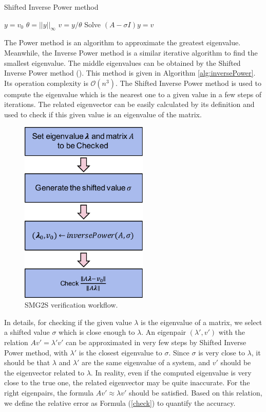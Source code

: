 \begin{algorithm}[t]{}
	\caption{ Shifted Inverse Power method}   
	\label{alg:inversePower}   
	\begin{algorithmic}[1]
		\State $y=v_0$
		\State $\theta=||y||_\infty$
		\State $v=y/\theta$
		\State Solve $(A-\sigma I)y=v$
		\EndFor 
		\EndFunction
	\end{algorithmic}  
\end{algorithm}


The Power method is an algorithm to approximate the greatest eigenvalue. Meanwhile, the Inverse Power method is a similar iterative algorithm to find the smallest eigenvalue. The middle eigenvalues can be obtained by the Shifted Inverse Power method (\cite{hernandez2005single}).  This method is given in Algorithm \ref{alg:inversePower}. Its operation complexity is $\mathcal{O}(n^3)$. The Shifted Inverse Power method is used to compute the eigenvalue which is the nearest one to a given value in a few steps of iterations. The related eigenvector can be easily calculated by its definition and used to check if this given value is an eigenvalue of the matrix.

\begin{figure}[t]
	\centering
	\includegraphics[width=2.4in]{fig/smg2s-check.pdf}
	\caption{SMG2S verification workflow.}
	\label{smg2s-check}
\end{figure}

In details, for checking if the given value $\lambda$ is the eigenvalue of a matrix, we select a shifted value $\sigma$ which is close enough to $\lambda$. An eigenpair $(\lambda', v')$ with the relation $Av'=\lambda' v'$ can be approximated in very few steps by Shifted Inverse Power method, with $\lambda'$ is the closest eigenvalue to $\sigma$. Since $\sigma$ is very close to $\lambda$, it should be that $\lambda$ and $\lambda'$ are the same eigenvalue of a system, and $v'$ should be the eigenvector related to $\lambda$. In reality, even if the computed eigenvalue is very close to the true one, the related eigenvector may be quite inaccurate. For the right eigenpairs, the formula $Av'\approx\lambda v'$ should be satisfied. Based on this relation, we define the relative error as Formula (\ref{check}) to quantify the accuracy. 

